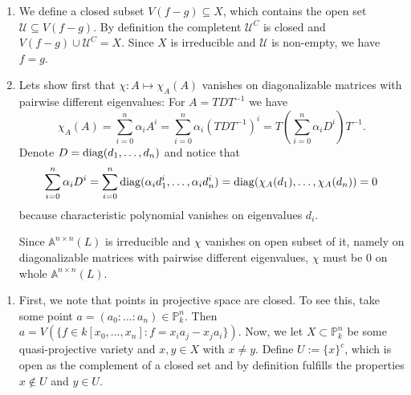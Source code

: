 \begin{exercise}{3}
    \begin{enumerate}
        \item{} We define a closed subset $V(f - g) \subseteq X$, which contains
            the open set $\mathcal{U} \subseteq V(f - g)$. By definition the
            completent $\mathcal{U}^C$ is closed and $V(f - g) \cup
            \mathcal{U}^C = X$. Since $X$ is irreducible and $\mathcal{U}$ is
            non-empty, we have $f = g$.

        \item{} Lets show first that $\chi \colon A \mapsto \chi_A(A)$ vanishes
            on diagonalizable matrices with pairwise different eigenvalues: For
            $A = T D T^{-1}$ we have
            \begin{equation*}
                \chi_A(A) = \sum^n_{i = 0} \alpha_i A^i = \sum^n_{i = 0}
                \alpha_i (T D T^{-1})^i = T \left( \sum^n_{i = 0} \alpha_i  D^i
                \right) T^{-1}.
            \end{equation*}
            Denote $D = \operatorname{diag}(d_1, \dots, d_n)$ and notice that
            \begin{equation*}
                \sum^n_{i = 0} \alpha_i  D^i = 
                \sum^n_{i = 0} \operatorname{diag}(\alpha_i d^i_1, \dots, \alpha_i d^i_n) = 
                \operatorname{diag}(\chi_A(d_1), \dots, \chi_A(d_n)) = 0
            \end{equation*}
            because characteristic polynomial vanishes on eigenvalues $d_i$.

            Since $\mathbb{A}^{n \times n}(L)$ is irreducible
            and $\chi$ vanishes on open subset of it, namely on diagonalizable
            matrices with pairwise different eigenvalues, $\chi$ must be $0$ on
            whole $\mathbb{A}^{n \times n}(L)$.
    \end{enumerate}
\end{exercise}

\begin{exercise}{4}
    \begin{enumerate}
        \item First, we note that points in projective space are closed.
        To see this, take some point $a=(a_0:...:a_n)\in \mathbb{P}^n_k$.
        Then $a=V(\lbrace f\in k[x_0,...,x_n]: f=x_ia_j-x_ja_i \rbrace).$
        Now, we let $X\subset \mathbb{P}^n_k$ be some quasi-projective variety and
        $x,y\in X$ with $x\neq y$. Define $U:=\lbrace x \rbrace^c$, which is open as
        the complement of a closed set and by definition fulfills the properties
        $x\not \in U$ and $y \in U$.
     \end{enumerate}
\end{exercise}

